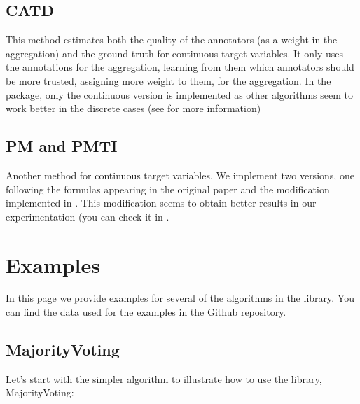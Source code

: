 \documentclass[letterpaper,10pt,english]{sphinxmanual}
\begin{document}
\section{CATD}
\label{\detokenize{package/methods:id7}}
This method estimates both the quality of the annotators (as a weight in the aggregation) and the ground truth
for continuous target variables. It only uses the annotations for the aggregation, learning from them which
annotators should be more trusted, assigning more weight to them, for the aggregation. In the package, only
the continuous version is implemented as other algorithms seem to work better in the discrete cases (see  for more information)


\section{PM and PMTI}
\label{\detokenize{package/methods:pm-and-pmti}}
Another method for continuous target variables. We implement two versions, one following the formulas appearing
in the original paper and the modification implemented in  . This modification seems to obtain better results in our experimentation (you can check it in .


\chapter{Examples}
\label{\detokenize{usage/examples:examples}}\label{\detokenize{usage/examples::doc}}
In this page we provide examples for several of the algorithms in the library.
You can find the data used for the examples in the Github repository.


\section{MajorityVoting}
\label{\detokenize{usage/examples:majorityvoting}}
Let’s start with the simpler algorithm to illustrate how to use the library, MajorityVoting:
\end{document}
